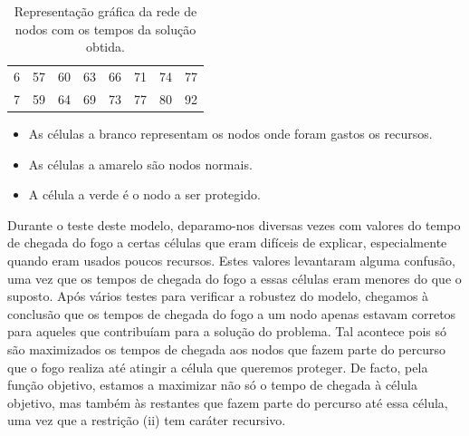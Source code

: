 \documentclass[11pt]{article} %
\begin{document}
\begin{table}[h]
\begin{tabular}{cccccccc}
\multicolumn{1}{c|}{6} & \multicolumn{1}{c|}{\cellcolor[HTML]{F8FF00}57} & \multicolumn{1}{c|}{\cellcolor[HTML]{F8FF00}60} & \multicolumn{1}{c|}{\cellcolor[HTML]{F8FF00}63} & \multicolumn{1}{c|}{\cellcolor[HTML]{F8FF00}66} & \multicolumn{1}{c|}{\cellcolor[HTML]{F8FF00}71} & \multicolumn{1}{c|}{\cellcolor[HTML]{F8FF00}74} & \multicolumn{1}{c|}{\cellcolor[HTML]{FFFFFF}77} \\ \cline{2-8}
\multicolumn{1}{c|}{7} & \multicolumn{1}{c|}{\cellcolor[HTML]{F8FF00}59} & \multicolumn{1}{c|}{\cellcolor[HTML]{F8FF00}64} & \multicolumn{1}{c|}{\cellcolor[HTML]{F8FF00}69} & \multicolumn{1}{c|}{\cellcolor[HTML]{F8FF00}73} & \multicolumn{1}{c|}{\cellcolor[HTML]{F8FF00}77} & \multicolumn{1}{c|}{\cellcolor[HTML]{FFFFFF}80} & \multicolumn{1}{c|}{\cellcolor[HTML]{32CB00}92} \\ \cline{2-8}
\end{tabular}
\caption{Representação gráfica da rede de nodos com os tempos da solução obtida.}
\end{table}
\begin{itemize}[$\ast$]
	\item As células a branco representam os nodos onde foram gastos os recursos.
    \item As células a amarelo são nodos normais.
    \item A célula a verde é o nodo a ser protegido.
\end{itemize}
\par Durante o teste deste modelo, deparamo-nos diversas vezes com valores do tempo de chegada do fogo a certas células que eram difíceis de explicar, especialmente quando eram usados poucos recursos. Estes valores levantaram alguma confusão, uma vez que os tempos de chegada do fogo a essas células eram menores do que o suposto. Após vários testes para verificar a robustez do modelo, chegamos à conclusão que os tempos de chegada do fogo a um nodo apenas estavam corretos para aqueles que contribuíam para a solução do problema. Tal acontece pois só são maximizados os tempos de chegada aos nodos que fazem parte do percurso que o fogo realiza até atingir a célula que queremos proteger. De facto, pela função objetivo, estamos a maximizar não só o tempo de chegada à célula objetivo, mas também às restantes que fazem parte do percurso até essa célula, uma vez que a restrição (ii) tem caráter recursivo.
\end{document}
